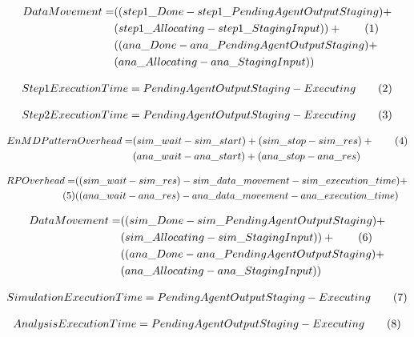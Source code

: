 \documentclass[]{article}
\newcommand\numberthis{\addtocounter{equation}{1}\tag{\theequation}}
\begin{document}
	\begin{align*}
		Data Movement = &((step1\_Done - step1\_PendingAgentOutputStaging) + \\
						&(step1\_Allocating - step1\_StagingInput)) + \numberthis \label{4} \\
						&((ana\_Done - ana\_PendingAgentOutputStaging) + \\
						&(ana\_Allocating - ana\_StagingInput)) 
	\end{align*}
	
	\begin{align*}
		Step 1 Execution Time = PendingAgentOutputStaging - Executing \numberthis \label{5}
	\end{align*}

	\begin{align*}
		Step 2 Execution Time = PendingAgentOutputStaging - Executing \numberthis \label{6}
	\end{align*}

	\begin{align*}
		EnMD Pattern Overhead = &(sim\_wait-sim\_start) + (sim\_stop - sim\_res) + \numberthis \label{7} \\
								&(ana\_wait-ana\_start) + (ana\_stop - ana\_res) 
	\end{align*}

	\begin{align*}
		RP Overhead = &((sim\_wait - sim\_res) - sim\_data\_movement - sim\_execution\_time) + \\ \numberthis \label{8} 
					  &((ana\_wait - ana\_res) - ana\_data\_movement - ana\_execution\_time) 
	\end{align*}

	\begin{align*}
		Data Movement = &((sim\_Done - sim\_PendingAgentOutputStaging) + \\
						&(sim\_Allocating - sim\_StagingInput)) + \numberthis \label{9} \\
						&((ana\_Done - ana\_PendingAgentOutputStaging) + \\
						&(ana\_Allocating - ana\_StagingInput)) 
	\end{align*}
	
	\begin{align*}
		Simulation Execution Time = PendingAgentOutputStaging - Executing \numberthis \label{10}
	\end{align*}

	\begin{align*}
		Analysis Execution Time = PendingAgentOutputStaging - Executing \numberthis \label{11}
	\end{align*}
\end{document}
